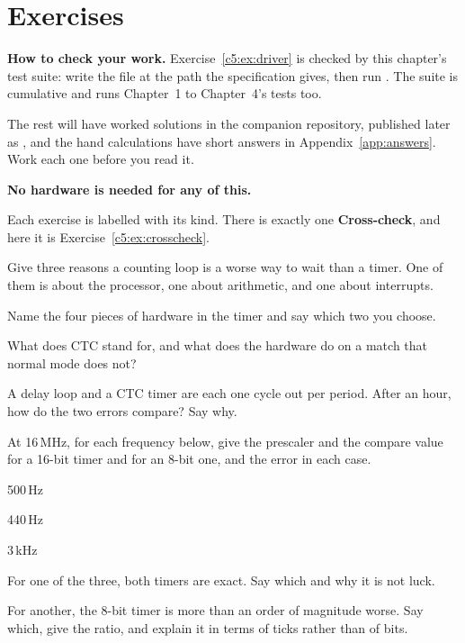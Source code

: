 
\section{Exercises}
\label{c5:sec:exercises}

\begin{aside}
\textbf{How to check your work.} Exercise~\ref{c5:ex:driver} is checked by this chapter's test
suite: write the file at the path the specification gives, then run . The suite is
cumulative and runs Chapter~1 to Chapter~4's tests too.

The rest will have worked solutions in the companion repository, published later as
, and the hand calculations have short answers in
Appendix~\ref{app:answers}. Work each one before you read it.

\textbf{No hardware is needed for any of this.}
\end{aside}

Each exercise is labelled with its kind. There is exactly one \textbf{Cross-check}, and here it is
Exercise~\ref{c5:ex:crosscheck}.

\label{c5:ex:loop}
\begin{parts}
  \item Give three reasons a counting loop is a worse way to wait than a timer. One of them is
    about the processor, one about arithmetic, and one about interrupts.
  \item Name the four pieces of hardware in the timer and say which two you choose.
  \item What does CTC stand for, and what does the hardware do on a match that normal mode does
    not?
  \item A delay loop and a CTC timer are each one cycle out per period. After an hour, how do the
    two errors compare? Say why.
\end{parts}

\label{c5:ex:compare}
At 16\,MHz, for each frequency below, give the prescaler and the compare value for a 16-bit timer
and for an 8-bit one, and the error in each case.
\begin{parts}
  \item 500\,Hz
  \item 440\,Hz
  \item 3\,kHz
  \item For one of the three, both timers are exact. Say which and why it is not luck.
  \item For another, the 8-bit timer is more than an order of magnitude worse. Say which, give the
    ratio, and explain it in terms of ticks rather than of bits.
\end{parts}

